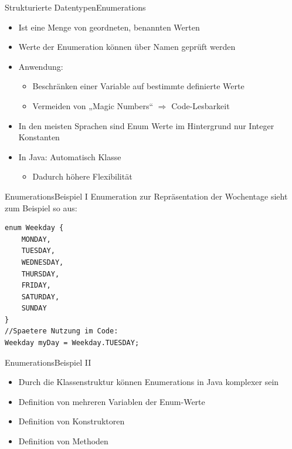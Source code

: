 \begin{frame}{Strukturierte Datentypen}{Enumerations}
    \begin{itemize}
        \item Ist eine Menge von geordneten, benannten Werten
        \item Werte der Enumeration können über Namen geprüft werden
        \item Anwendung:
        \begin{itemize}
            \item Beschränken einer Variable auf bestimmte definierte Werte
            \item Vermeiden von „Magic Numbers“ $\Rightarrow$ Code-Lesbarkeit
        \end{itemize}
        \item In den meisten Sprachen sind Enum Werte im Hintergrund nur Integer Konstanten
        \item In Java: Automatisch Klasse
        \begin{itemize}
            \item Dadurch höhere Flexibilität
        \end{itemize}
    \end{itemize}
\end{frame}

\begin{frame}[fragile]{Enumerations}{Beispiel I}
Enumeration zur Repräsentation der Wochentage sieht zum Beispiel so aus:
\lstset{style=javacode}
\begin{lstlisting}
enum Weekday {
    MONDAY,
    TUESDAY,
    WEDNESDAY,
    THURSDAY,
    FRIDAY,
    SATURDAY,
    SUNDAY
}
//Spaetere Nutzung im Code:
Weekday myDay = Weekday.TUESDAY;
\end{lstlisting}
\end{frame}

\begin{frame}{Enumerations}{Beispiel II}
	\begin{itemize}
		\item Durch die Klassenstruktur können Enumerations in Java komplexer sein
		\item Definition von mehreren Variablen der Enum-Werte
		\item Definition von Konstruktoren
		\item Definition von Methoden
	\end{itemize}
\end{frame}


